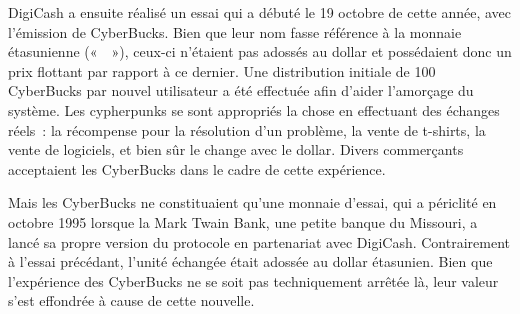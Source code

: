 DigiCash a ensuite réalisé un essai qui a débuté le 19 octobre de cette année, avec l'émission de CyberBucks. Bien que leur nom fasse référence à la monnaie étasunienne («~~»), ceux-ci n'étaient pas adossés au dollar et possédaient donc un prix flottant par rapport à ce dernier. Une distribution initiale de 100 CyberBucks par nouvel utilisateur a été effectuée afin d'aider l'amorçage du système. Les cypherpunks se sont appropriés la chose en effectuant des échanges réels~: la récompense pour la résolution d'un problème, la vente de t-shirts, la vente de logiciels, et bien sûr le change avec le dollar. Divers commerçants acceptaient les CyberBucks dans le cadre de cette expérience.

Mais les CyberBucks ne constituaient qu'une monnaie d'essai, qui a périclité en octobre 1995 lorsque la Mark Twain Bank, une petite banque du Missouri, a lancé sa propre version du protocole en partenariat avec DigiCash. Contrairement à l'essai précédant, l'unité échangée était adossée au dollar étasunien. Bien que l'expérience des CyberBucks ne se soit pas techniquement arrêtée là, leur valeur s'est effondrée à cause de cette nouvelle. %

